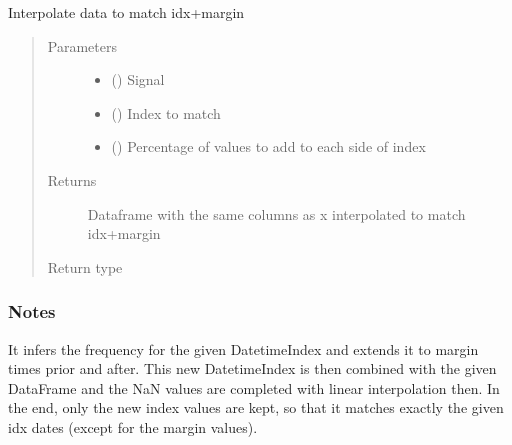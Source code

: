 \documentclass[letterpaper,10pt,english]{sphinxmanual}
\begin{document}
\begin{fulllineitems}
\label{\detokenize{correlator:correlator.interpolate}}
\sphinxAtStartPar
Interpolate data to match idx+\sphinxhyphen{}margin
\begin{quote}\begin{description}
\item[{Parameters}] \leavevmode\begin{itemize}
\item {} 
\sphinxAtStartPar
{} () \textendash{} Signal

\item {} 
\sphinxAtStartPar
{} () \textendash{} Index to match

\item {} 
\sphinxAtStartPar
{} () \textendash{} Percentage of values to add to each side of index

\end{itemize}

\item[{Returns}] \leavevmode
\sphinxAtStartPar
Dataframe with the same columns as x interpolated to match idx+\sphinxhyphen{}margin

\item[{Return type}] \leavevmode
\sphinxAtStartPar
{}

\end{description}\end{quote}
\subsubsection*{Notes}

\sphinxAtStartPar
It infers the frequency for the given DatetimeIndex and extends it to margin times prior
and after. This new DatetimeIndex is then combined with the given DataFrame and the NaN
values are completed with linear interpolation then. In the end, only the new index values
are kept, so that it matches exactly the given idx dates (except for the margin values).

\end{fulllineitems}
\end{document}
